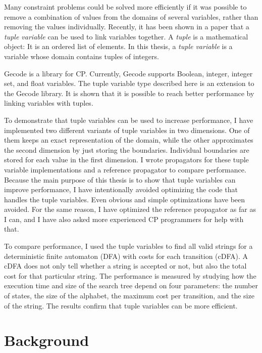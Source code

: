 \documentclass[a4paper,11pt]{article}
\begin{document}
Many constraint problems could be solved more efficiently if it was possible to remove a combination of values from the domains of several variables, rather than removing the values individually. Recently, it has been shown in a paper \cite{Monette771427} that a \textit{tuple variable} can be used to link variables together. A \textit{tuple} is a mathematical object: It is an ordered list of elements. In this thesis, a \textit{tuple variable} is a variable whose domain contains tuples of integers. 

Gecode is a library for CP. Currently, Gecode supports Boolean, integer, integer set, and float variables. The tuple variable type described here is an extension to the Gecode library. It is shown that it is possible to reach better performance by linking variables with tuples.

To demonstrate that tuple variables can be used to increase performance, I have implemented two different variants of tuple variables in two dimensions. One of them keeps an exact representation of the domain, while the other approximates the second dimension by just storing the boundaries. Individual boundaries are stored for each value in the first dimension. I wrote propagators for these tuple variable implementations and a reference propagator to compare performance. Because the main purpose of this thesis is to show that tuple variables can improve performance, I have intentionally avoided optimizing the code that handles the tuple variables. Even obvious and simple optimizations have been avoided. For the same reason, I have optimized the reference propagator as far as I can, and I have also asked more experienced CP programmers for help with that.

To compare performance, I used the tuple variables to find all valid strings for a deterministic finite automaton (DFA) with costs for each transition (cDFA). A cDFA does not only tell whether a string is accepted or not, but also the total cost for that particular string. The performance is measured by studying how the execution time and size of the search tree depend on four parameters: the number of states, the size of the alphabet, the maximum cost per transition, and the size of the string. The results confirm that tuple variables can be more efficient.

\section{Background}
\end{document}
